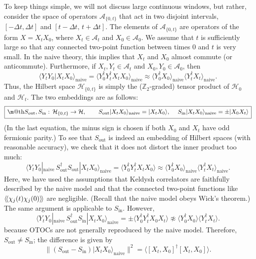 \documentclass[12pt]{article}
\makeatletter
\newcommand*{\wideboxed}[1]{\setlength{\fboxsep}{1ex}%
  \fbox{\m@th$\displaystyle#1$}}
\newcommand{\blangle}{\bigl\langle}
\newcommand{\brangle}{\bigr\rangle}
\newcommand{\dlangle}{\langle\kern-1.5pt\langle}
\newcommand{\drangle}{\rangle\kern-1.5pt\rangle}
\newcommand*{\braa}[1]{\langle{#1}|}
\newcommand*{\kett}[1]{|{#1}\rangle}
\newcommand*{\bbrakett}[2]{\blangle{#1}\big|{#2}\brangle}
\newcommand*{\corr}[1]{\langle{#1}\rangle}
\newcommand*{\bcorr}[1]{\blangle{#1}\brangle}
\newcommand*{\ccorr}[1]{\dlangle{#1}\drangle}
\newcommand{\calA}{\mathcal{A}}
\newcommand{\calH}{\mathcal{H}}
\newcommand{\ZZ}{\mathbb{Z}}
\newcommand{\IN}{\text{in}}
\newcommand{\OUT}{\text{out}}
\newcommand{\naive}{\text{naive}}
\makeatother
\begin{document}
To keep things simple, we will not discuss large continuous windows, but rather, consider the space of operators $\calA_{\{0,t\}}$ that act in two disjoint intervals, $[-\Delta t,\Delta t]$ and $[t-\Delta t,\,t+\Delta t]$. The elements of $\calA_{\{0,t\}}$ are operators of the form $X=X_tX_0$, where $X_t\in\calA_t$ and $X_0\in\calA_0$. We assume that $t$ is sufficiently large so that any connected two-point function between times $0$ and $t$ is very small. In the naive theory, this implies that $X_t$ and $X_0$ almost commute (or anticommute). Furthermore, if $X_t,Y_t\in\calA_t$ and $X_0,Y_0\in\calA_0$, then
\begin{equation}
\bbrakett{Y_tY_0}{X_tX_0}_\naive
=\bcorr{Y_{0}^{\dag}Y_{t}^{\dag}X_{t}X_{0}}_\naive
\approx \corr{Y_{0}^{\dag}X_{0}}_\naive\corr{Y_{t}^{\dag}X_{t}}_\naive.
\end{equation}
Thus, the Hilbert space $\calH_{\{0,t\}}$ is simply the ($\ZZ_2$-graded) tensor product of $\calH_0$ and $\calH_t$. The two embeddings are as follows:
\begin{equation}
\wideboxed{
S_{\OUT},S_{\IN}:\,\calH_{\{0,t\}}\to\calH,\qquad
S_{\OUT}\kett{X_tX_0}_\naive=\kett{X_tX_0},\quad\:
S_{\IN}\kett{X_tX_0}_\naive=\pm\kett{X_0X_t}
}
\end{equation}
(In the last equation, the minus sign is chosen if both $X_0$ and $X_t$ have odd fermionic parity.) To see that $S_{\OUT}$ is indeed an embedding of Hilbert spaces (with reasonable accuracy), we check that it does not distort the inner product too much:
\begin{equation}
\braa{Y_tY_0}_\naive\, S_{\OUT}^{\dag}S_{\OUT} \kett{X_tX_0}_\naive
=\corr{Y_0^{\dag}Y_t^{\dag}X_tX_0}
\approx\corr{Y_0^{\dag}X_0}_\naive\corr{Y_t^{\dag}X_t}_\naive.
\end{equation}
Here, we have used the assumptions that Keldysh correlators are faithfully described by the naive model and that the connected two-point functions like $\ccorr{\chi_j(t)\chi_j(0)}$ are negligible. (Recall that the naive model obeys Wick's theorem.) The same argument is applicable to $S_{\IN}$. However,
\begin{equation}
\braa{Y_tY_0}_\naive\, S_{\OUT}^{\dag}S_{\IN} \kett{X_tX_0}_\naive
=\pm\corr{Y_0^{\dag}Y_t^{\dag}X_0X_t}
\not\approx\corr{Y_0^{\dag}X_0}\corr{Y_t^{\dag}X_t}.
\end{equation}
because OTOCs are not generally reproduced by the naive model. Therefore, $S_{\OUT}\not=S_{\IN}$; the difference is given by
\begin{equation}
\bigl\|(S_{\OUT}-S_{\IN})\kett{X_tX_0}_\naive\bigr\|^2
=\bcorr{[X_t,X_0]^{\dag}[X_t,X_0]}.
\end{equation}
\end{document}
